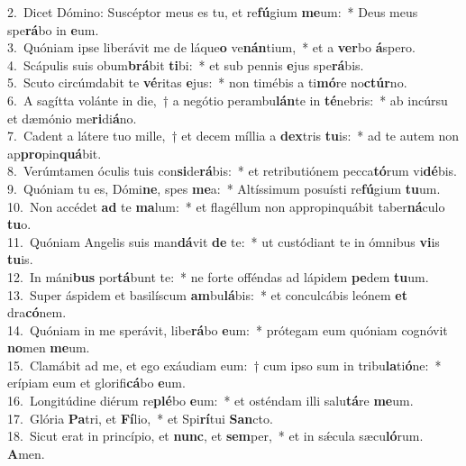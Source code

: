 {2.~}Dicet Dómino: Suscéptor meus es tu, et re\textbf{fú}gium \textbf{me}um:~* Deus meus spe\textbf{rá}bo in \textbf{e}um.\\
{3.~}Quóniam ipse liberávit me de láque\textbf{o} ve\textbf{nán}tium,~* et a \textbf{ver}bo \textbf{á}spero.\\
{4.~}Scápulis suis obum\textbf{brá}bit \textbf{ti}bi:~* et sub pennis \textbf{e}jus spe\textbf{rá}bis.\\
{5.~}Scuto circúmdabit te \textbf{vé}ritas \textbf{e}jus:~* non timébis a ti\textbf{mó}re no\textbf{ctúr}no.\\
{6.~}A sagítta volánte in die,~† a negótio perambu\textbf{lán}te in \textbf{té}nebris:~* ab incúrsu et dæmónio me\textbf{ri}di\textbf{á}no.\\
{7.~}Cadent a látere tuo mille,~† et decem míllia a \textbf{dex}tris \textbf{tu}is:~* ad te autem non ap\textbf{pro}pin\textbf{quá}bit.\\
{8.~}Verúmtamen óculis tuis con\textbf{si}de\textbf{rá}bis:~* et retributiónem pecca\textbf{tó}rum vi\textbf{dé}bis.\\
{9.~}Quóniam tu es, Dómi\textbf{ne}, spes \textbf{me}a:~* Altíssimum posuísti re\textbf{fú}gium \textbf{tu}um.\\
{10.~}Non accédet \textbf{ad} te \textbf{ma}lum:~* et flagéllum non appropinquábit taber\textbf{ná}culo \textbf{tu}o.\\
{11.~}Quóniam Angelis suis man\textbf{dá}vit \textbf{de} te:~* ut custódiant te in ómnibus \textbf{vi}is \textbf{tu}is.\\
{12.~}In máni\textbf{bus} por\textbf{tá}bunt te:~* ne forte offéndas ad lápidem \textbf{pe}dem \textbf{tu}um.\\
{13.~}Super áspidem et basilíscum \textbf{am}bu\textbf{lá}bis:~* et conculcábis leónem \textbf{et} dra\textbf{có}nem.\\
{14.~}Quóniam in me sperávit, libe\textbf{rá}bo \textbf{e}um:~* prótegam eum quóniam cognóvit \textbf{no}men \textbf{me}um.\\
{15.~}Clamábit ad me, et ego exáudiam eum:~† cum ipso sum in tribu\textbf{la}ti\textbf{ó}ne:~* erípiam eum et glorifi\textbf{cá}bo \textbf{e}um.\\
{16.~}Longitúdine diérum re\textbf{plé}bo \textbf{e}um:~* et osténdam illi salu\textbf{tá}re \textbf{me}um.\\
{17.~}Glória \textbf{Pa}tri, et \textbf{Fí}lio,~* et Spi\textbf{rí}tui \textbf{San}cto.\\
{18.~}Sicut erat in princípio, et \textbf{nunc}, et \textbf{sem}per,~* et in sǽcula sæcu\textbf{ló}rum. \textbf{A}men.\\
